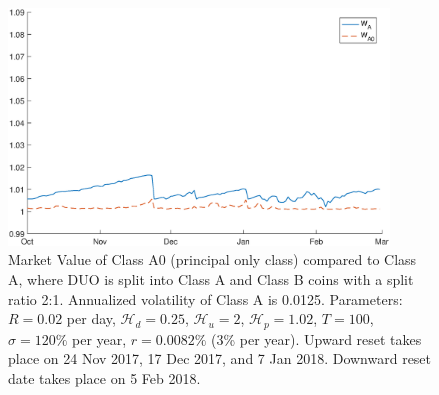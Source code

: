 \documentclass[draft, noinfoline]{ectaart}
\numberwithin{equation}{section}
\theoremstyle{plain}
\begin{document}
\begin{appendices}
\begin{figure}[!htb]
\centering
\includegraphics[width=0.9\textwidth]{WA0_alpha2.eps}
\caption{Market Value of Class A0 (principal only class) compared to Class A, where DUO is split into Class A and Class B coins with a split ratio 2:1. Annualized volatility of Class A is 0.0125. Parameters: $R=0.02$ per day, $\mathcal{H}_{d}=0.25$, $\mathcal{H}_{u} =2$, $\mathcal{H}_{p}=1.02$, $T=100$, $\sigma= 120\%$ per year, $r=0.0082\%$ (3\% per year). Upward reset takes place on 24 Nov 2017, 17 Dec 2017, and 7 Jan 2018. Downward reset date takes place on 5 Feb 2018.}
\label{fig:valA0a2}
\end{figure}






\end{appendices}
\end{document}
